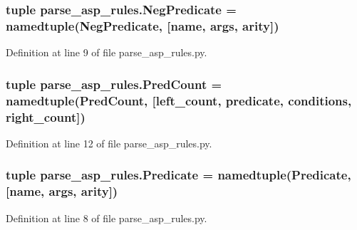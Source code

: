\subsubsection[{Neg\+Predicate}]{\setlength{\rightskip}{0pt plus 5cm}tuple parse\+\_\+asp\+\_\+rules.\+Neg\+Predicate = namedtuple(\textquotesingle{}Neg\+Predicate\textquotesingle{}, \mbox{[}\textquotesingle{}name\textquotesingle{}, \textquotesingle{}args\textquotesingle{}, \textquotesingle{}arity\textquotesingle{}\mbox{]})}\label{namespaceparse__asp__rules_a7385160dd946ac7f3eb5cd48b40a1287}


Definition at line 9 of file parse\+\_\+asp\+\_\+rules.\+py.

\hypertarget{namespaceparse__asp__rules_ad6499631d0c32c55386ca6c1e97cf88f}{}
\subsubsection[{Pred\+Count}]{\setlength{\rightskip}{0pt plus 5cm}tuple parse\+\_\+asp\+\_\+rules.\+Pred\+Count = namedtuple(\textquotesingle{}Pred\+Count\textquotesingle{}, \mbox{[}\textquotesingle{}left\+\_\+count\textquotesingle{}, \textquotesingle{}predicate\textquotesingle{}, \textquotesingle{}conditions\textquotesingle{}, \textquotesingle{}right\+\_\+count\textquotesingle{}\mbox{]})}\label{namespaceparse__asp__rules_ad6499631d0c32c55386ca6c1e97cf88f}


Definition at line 12 of file parse\+\_\+asp\+\_\+rules.\+py.

\hypertarget{namespaceparse__asp__rules_acc4a48d78de76e3b65c2aa3ebba7e194}{}
\subsubsection[{Predicate}]{\setlength{\rightskip}{0pt plus 5cm}tuple parse\+\_\+asp\+\_\+rules.\+Predicate = namedtuple(\textquotesingle{}Predicate\textquotesingle{}, \mbox{[}\textquotesingle{}name\textquotesingle{}, \textquotesingle{}args\textquotesingle{}, \textquotesingle{}arity\textquotesingle{}\mbox{]})}\label{namespaceparse__asp__rules_acc4a48d78de76e3b65c2aa3ebba7e194}


Definition at line 8 of file parse\+\_\+asp\+\_\+rules.\+py.

